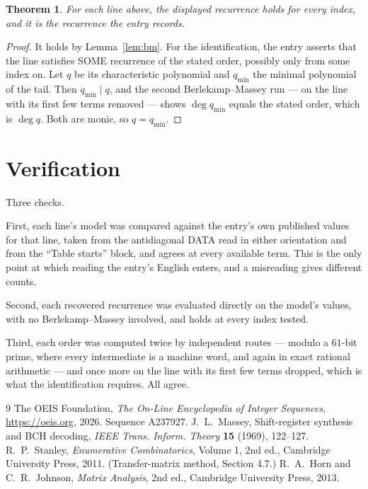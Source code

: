 \documentclass[11pt,a4paper]{article}
\theoremstyle{plain}
\newtheorem{theorem}{Theorem}
\theoremstyle{definition}
\begin{document}
\begin{theorem}
For each line above, the displayed recurrence holds for every index, and it is the recurrence
the entry records.
\end{theorem}

\begin{proof}
It holds by Lemma~\ref{lem:bm}. For the identification, the entry asserts that the line
satisfies SOME recurrence of the stated order, possibly only from some index on. Let $q$ be its
characteristic polynomial and $q_{\min}$ the minimal polynomial of the tail. Then
$q_{\min}\mid q$, and the second Berlekamp--Massey run --- on the line with its first few
terms removed --- shows $\deg q_{\min}$ equals the stated order, which is $\deg q$. Both are
monic, so $q=q_{\min}$.
\end{proof}

\section{Verification}

Three checks.

First, each line's model was compared against the entry's own published values for that line,
taken from the antidiagonal DATA read in either orientation and from the ``Table starts''
block, and agrees at every available term. This is the only point at which reading the entry's
English enters, and a misreading gives different counts.

Second, each recovered recurrence was evaluated directly on the model's values, with no
Berlekamp--Massey involved, and holds at every index tested.

Third, each order was computed twice by independent routes --- modulo a $61$-bit prime, where
every intermediate is a machine word, and again in exact rational arithmetic --- and once more
on the line with its first few terms dropped, which is what the identification requires. All
agree.

\begin{thebibliography}{9}
 The OEIS Foundation, \emph{The On-Line Encyclopedia of Integer
Sequences}, \url{https://oeis.org}, 2026. Sequence A237927.
 J.~L.~Massey, Shift-register synthesis and BCH decoding, \emph{IEEE
Trans. Inform. Theory} \textbf{15} (1969), 122--127.
 R.~P.~Stanley, \emph{Enumerative Combinatorics}, Volume 1, 2nd ed.,
Cambridge University Press, 2011. (Transfer-matrix method, Section 4.7.)
 R.~A.~Horn and C.~R.~Johnson, \emph{Matrix Analysis}, 2nd ed., Cambridge
University Press, 2013.
\end{thebibliography}
\end{document}
